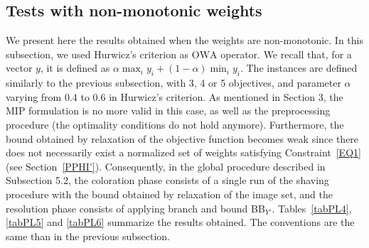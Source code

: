 \documentclass[final,3p,times]{elsarticle}
\newcommand{\owa}{\mbox{OWA}}
\begin{document}
\subsection{Tests with non-monotonic weights}

We present here the results obtained when the weights are
non-monotonic. In this subsection, we used Hurwicz's criterion as
$\owa$ operator. We recall that, for a vector $y$, it is defined as
$\alpha \max_i y_i + (1-\alpha) \min_i y_i$. The instances are defined
similarly to the previous subsection, with 3, 4 or 5 objectives, and
parameter $\alpha$ varying from 0.4 to 0.6 in Hurwicz's criterion. As
mentioned in Section 3, the MIP formulation is no more valid in this
case, as well as the preprocessing procedure (the optimality
conditions do not hold anymore). Furthermore, the bound obtained by
relaxation of the objective function becomes weak since there does not
necessarily exist a normalized set of weights satisfying
Constraint~\ref{EQ1} (see Section~\ref{PPHI'}). Consequently, in the
global procedure described in Subsection 5.2, the coloration phase consists of a
single run of the shaving procedure with the bound obtained by
relaxation of the image set, and the resolution phase consists of
applying branch and bound BB$_{Y'}$. Tables~\ref{tabPL4}, \ref{tabPL5}
and \ref{tabPL6} summarize the results obtained. The conventions are the same than in the previous subsection.
\end{document}
